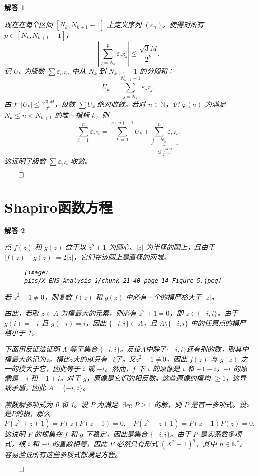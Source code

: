 \documentclass[12pt,UTF8]{ctexbook}
\theoremstyle{exercisestyle}
\theoremstyle{solutionstyle}
\newtheorem*{solution*}{解答}
\newenvironment{solution}
  {\begin{solution*}}
  {\hfill\ensuremath{\qed}\end{solution*}}
\begin{document}
\begin{solution}
\begin{subquestions}
现在在每个区间 \( [N_k, N_{k+1}-1] \) 上定义序列 \( (\varepsilon_n) \)，使得对所有 \( p \in [N_k, N_{k+1}-1] \)，
\[
\left| \sum_{j=N_k}^p \varepsilon_j z_j \right| \leqslant \frac{\sqrt{3}M}{2^k}.
\]
记 \( U_k \) 为级数 \( \sum \varepsilon_n z_n \) 中从 \( N_k \) 到 \( N_{k+1} - 1 \) 的分段和：
\[
U_k = \sum_{j=N_k}^{N_{k+1}-1} \varepsilon_j z_j.
\]
由于 \( |U_k| \leqslant \frac{\sqrt{3}M}{2^k} \)，级数 \( \sum U_k \) 绝对收敛。若对 \( n \in \mathbb{N} \)，记 \( \varphi(n) \) 为满足 \( N_k \leqslant n < N_{k+1} \) 的唯一指标 \( k \)，则
\[
\sum_{i=1}^n \varepsilon_i z_i = \sum_{k=0}^{\varphi(n)-1} U_k + \underbrace{\sum_{j=N_k}^n \varepsilon_i z_i}_{\leqslant \frac{\sqrt{3}M}{2^{\varphi(n)}}}.
\]
这证明了级数 \( \sum \varepsilon_i z_i \) 收敛。
\end{subquestions}
\end{solution}

\section{Shapiro函数方程}
\begin{solution}
  \begin{subquestions}
    \item 点 \(f(z)\) 和 \(g(z)\) 位于以 \(z^2 + 1\) 为圆心、\( |z| \) 为半径的圆上，且由于 \(|f(z) - g(z)| = 2|z|\)，它们在该圆上是直径的两端。
    \begin{figure}[htbp]
      \centering
      \texttt{[image: pics/X\_ENS\_Analysis\_1/chunk\_21\_40\_page\_14\_Figure\_5.jpeg]}
    \end{figure}
    
    若 \(z^2 + 1 \neq 0\)，则复数 \(f(z)\) 和 \(g(z)\) 中必有一个的模严格大于 \(|z|\)。
    
    由此，若取 \(z \in A\) 为模最大的元素，则必有 \(z^2 + 1 = 0\)，即 \(z \in \{-i, i\}\)。由于 \(g(i) = -i\) 且 \(g(-i) = i\)，因此 \(\{-i, i\} \subset A\)，且 \(A \setminus \{-i, i\}\) 中的任意点的模严格小于 1。
    
    下面用反证法证明 \(A\) 等于集合 \(\{-i, i\}\)。反设$A$中除了\(\{-i, i\}\)还有别的数，取其中模最大的记为$z$。模比$z$大的就只有$\pm i$了。又\(z^2 + 1 \neq 0\)，因此 \(f(z)\) 与 \(g(z)\) 之一的模大于它，因此等于 \(i\) 或 \(-i\)。然而，\(f\) 下 \(i\) 的原像是 \(i\) 和 \(-1-i\)，\(-i\) 的原像是 \(-i\) 和 \(-1+i\)。对于 \(g\)，原像是它们的相反数。这些原像的模均 \(\geqslant 1\)，这导致矛盾。因此 \(A = \{-i, i\}\)。
    
    \item 常数解多项式为 0 和 1。设 \(P\) 为满足 \(\deg P \ge 1\) 的解，则 \(P\) 是首一多项式。设$z$是$P$的根，那么
    $$P(z^2 + z + 1) = P(z)P(z + 1) = 0, \quad P(z^2 - z + 1) = P(z - 1)P(z) = 0.$$
    这说明 \(P\) 的根集在 \(f\) 和 \(g\) 下稳定，因此是集合 \(\{-i, i\}\)。由于 \(P\) 是实系数多项式，根 \(i\) 和 \(-i\) 的重数相等，因此 \(P\) 必然具有形式 \((X^2 + 1)^n\)，其中 \(n \in \mathbb{N}^*\)。容易验证所有这些多项式都满足方程。
  \end{subquestions}
\end{solution}
\end{document}
